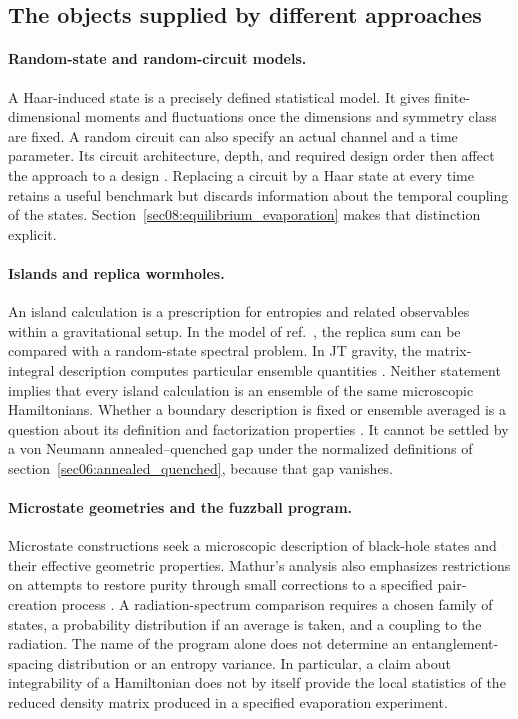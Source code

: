 \documentclass[11pt,letterpaper]{article}
\theoremstyle{plain}
\theoremstyle{definition}
\theoremstyle{remark}
\begin{document}
\subsection{The objects supplied by different approaches}

\paragraph{Random-state and random-circuit models.}
A Haar-induced state is a precisely defined statistical model. It gives
finite-dimensional moments and fluctuations once the dimensions and
symmetry class are fixed. A random circuit can also specify an actual
channel and a time parameter. Its circuit architecture, depth, and
required design order then affect the approach to a design
\cite{brandaoetal2016}.
Replacing a circuit by a Haar state at every time retains a useful
benchmark but discards information about the temporal coupling of the
states. Section~\ref{sec08:equilibrium_evaporation} makes that distinction
explicit.

\paragraph{Islands and replica wormholes.}
An island calculation is a prescription for entropies and related
observables within a gravitational setup. In the model of
ref.~\cite{pssyetal2022}, the replica sum can be compared with a
random-state spectral problem. In JT gravity, the matrix-integral
description computes particular ensemble quantities
\cite{saadetal2019}. Neither statement implies that every island
calculation is an ensemble of the same microscopic Hamiltonians.
Whether a boundary description is fixed or ensemble averaged is a
question about its definition and factorization properties
\cite{marolfmaxfield2020}. It cannot be settled by a von Neumann
annealed--quenched gap under the normalized definitions of
section~\ref{sec06:annealed_quenched}, because that gap vanishes.

\paragraph{Microstate geometries and the fuzzball program.}
Microstate constructions seek a microscopic description of black-hole
states and their effective geometric properties. Mathur's analysis also
emphasizes restrictions on attempts to restore purity through small
corrections to a specified pair-creation process \cite{mathur2009}.
A radiation-spectrum comparison requires a chosen family of states,
a probability distribution if an average is taken, and a coupling to
the radiation. The name of the program alone does not determine an
entanglement-spacing distribution or an entropy variance. In
particular, a claim about integrability of a Hamiltonian does not by
itself provide the local statistics of the reduced density matrix
produced in a specified evaporation experiment.
\end{document}
